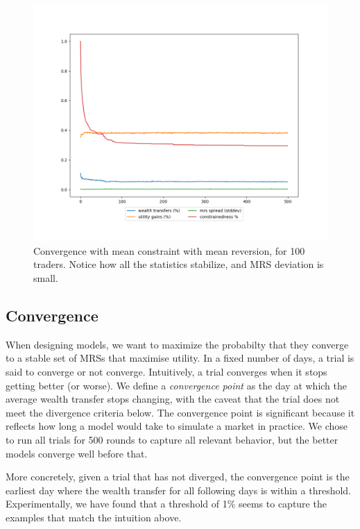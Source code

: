 \documentclass[12pt,a4paper,titlepage]{article}
\begin{document}
\begin{figure}[H]
    \centering
    \includegraphics[width=\textwidth]{seed_5.png}
    \caption{
      Convergence with mean constraint with mean reversion, for 100 traders.
      Notice how all the statistics stabilize, and MRS deviation is small.
    }
    \label{fig:conv}
\end{figure}

\subsection{Convergence}
When designing models, we want to maximize the probabilty that they converge to a stable set of MRSs that maximise utility.
In a fixed number of days, a trial is said to converge or not converge.
Intuitively, a trial converges when it stops getting better (or worse).
We define a \textit{convergence point} as the day at which the average wealth transfer stops changing, with the caveat that the trial does not meet the divergence criteria below.
The convergence point is significant because it reflects how long a model would take to simulate a market in practice.
We chose to run all trials for 500 rounds to capture all relevant behavior, but the better models converge well before that.

More concretely, given a trial that has not diverged, the convergence point is the earliest day where the wealth transfer for all following days is within a threshold.
Experimentally, we have found that a threshold of 1\% seems to capture the examples that match the intuition above.
\end{document}
